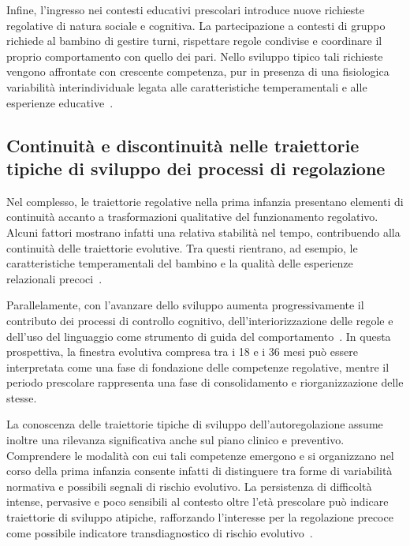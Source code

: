             Infine, l'ingresso nei contesti educativi prescolari introduce nuove richieste regolative di natura sociale e cognitiva. La partecipazione a contesti di gruppo richiede al bambino di gestire turni, rispettare regole condivise e coordinare il proprio comportamento con quello dei pari. Nello sviluppo tipico tali richieste vengono affrontate con crescente competenza, pur in presenza di una fisiologica variabilità interindividuale legata alle caratteristiche temperamentali e alle esperienze educative~\cite{calkins2007hill,rothbart2006}.

        \subsection{Continuità e discontinuità nelle traiettorie tipiche di sviluppo dei processi di regolazione}
        \label{sec:1_6_3}

            Nel complesso, le traiettorie regolative nella prima infanzia presentano elementi di continuità accanto a trasformazioni qualitative del funzionamento regolativo. Alcuni fattori mostrano infatti una relativa stabilità nel tempo, contribuendo alla continuità delle traiettorie evolutive. Tra questi rientrano, ad esempio, le caratteristiche temperamentali del bambino e la qualità delle esperienze relazionali precoci~\cite{rothbart2006}.

            Parallelamente, con l'avanzare dello sviluppo aumenta progressivamente il contributo dei processi di controllo cognitivo, dell'interiorizzazione delle regole e dell'uso del linguaggio come strumento di guida del comportamento~\cite{blair2015,diamond2013}. In questa prospettiva, la finestra evolutiva compresa tra i 18 e i 36 mesi può essere interpretata come una fase di fondazione delle competenze regolative, mentre il periodo prescolare rappresenta una fase di consolidamento e riorganizzazione delle stesse.

            La conoscenza delle traiettorie tipiche di sviluppo dell'autoregolazione assume inoltre una rilevanza significativa anche sul piano clinico e preventivo. Comprendere le modalità con cui tali competenze emergono e si organizzano nel corso della prima infanzia consente infatti di distinguere tra forme di variabilità normativa e possibili segnali di rischio evolutivo. La persistenza di difficoltà intense, pervasive e poco sensibili al contesto oltre l'età prescolare può indicare traiettorie di sviluppo atipiche, rafforzando l'interesse per la regolazione precoce come possibile indicatore transdiagnostico di rischio evolutivo~\cite{calkins2007,blair2015}.

